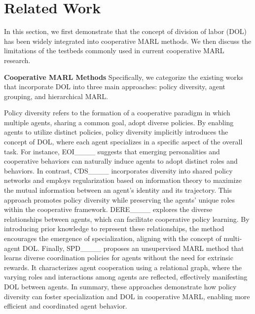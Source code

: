 \section{Related Work}
In this section, we first demonstrate that the concept of division of labor (DOL) has been widely integrated into cooperative MARL methods.
We then discuss the limitations of the testbeds commonly used in current cooperative MARL research.

\textbf{Cooperative MARL Methods}
Specifically, we categorize the existing works that incorporate DOL into three main approaches: policy diversity, agent grouping, and hierarchical MARL.

Policy diversity refers to the formation of a cooperative paradigm in which multiple agents, sharing a common goal, adopt diverse policies.
By enabling agents to utilize distinct policies, policy diversity implicitly introduces the concept of DOL, where each agent specializes in a specific aspect of the overall task.
For instance, EOI____ suggests that emerging personalities and cooperative behaviors can naturally induce agents to adopt distinct roles and behaviors.
In contrast, CDS____ incorporates diversity into shared policy networks and employs regularization based on information theory to maximize the mutual information between an agent’s identity and its trajectory.
This approach promotes policy diversity while preserving the agents' unique roles within the cooperative framework.
DERE____ explores the diverse relationships between agents, which can facilitate cooperative policy learning.
By introducing prior knowledge to represent these relationships, the method encourages the emergence of specialization, aligning with the concept of multi-agent DOL.
Finally, SPD____ proposes an unsupervised MARL method that learns diverse coordination policies for agents without the need for extrinsic rewards.
It characterizes agent cooperation using a relational graph, where the varying roles and interactions among agents are reflected, effectively manifesting DOL between agents.
In summary, these approaches demonstrate how policy diversity can foster specialization and DOL in cooperative MARL, enabling more efficient and coordinated agent behavior.

